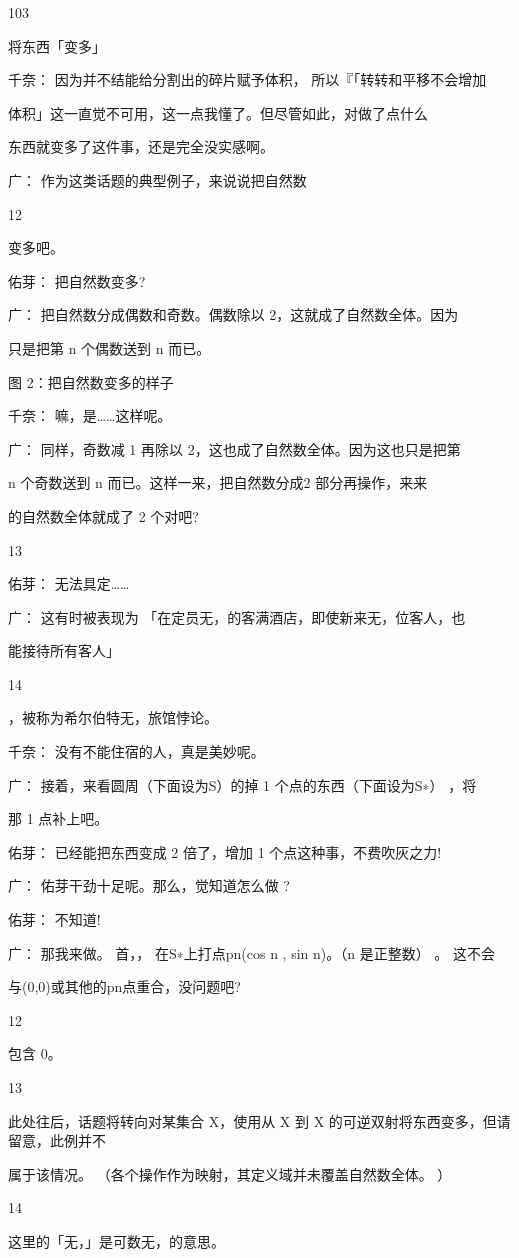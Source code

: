 103\par
将东西「变多」\par
千奈： 因为并不结能给分割出的碎片赋予体积， 所以『「转转和平移不会增加\par
体积」这一直觉不可用，这一点我懂了。但尽管如此，对做了点什么\par
东西就变多了这件事，还是完全没实感啊。\par
广： 作为这类话题的典型例子，来说说把自然数\par
12\par
变多吧。\par
佑芽： 把自然数变多?\par
广： 把自然数分成偶数和奇数。偶数除以 2，这就成了自然数全体。因为\par
只是把第 n 个偶数送到 n 而已。\par
图 2：把自然数变多的样子\par
千奈： 嘛，是……这样呢。\par
广： 同样，奇数减 1 再除以 2，这也成了自然数全体。因为这也只是把第\par
n 个奇数送到 n 而已。这样一来，把自然数分成2 部分再操作，来来\par
的自然数全体就成了 2 个对吧?\par
13\par
佑芽： 无法具定……\par
广： 这有时被表现为 「在定员无，的客满酒店，即使新来无，位客人，也\par
能接待所有客人」\par
14\par
，被称为希尔伯特无，旅馆悖论。\par
千奈： 没有不能住宿的人，真是美妙呢。\par
广： 接着，来看圆周（下面设为S）的掉 1 个点的东西（下面设为S∗） ，将\par
那 1 点补上吧。\par
佑芽： 已经能把东西变成 2 倍了，增加 1 个点这种事，不费吹灰之力!\par
广： 佑芽干劲十足呢。那么，觉知道怎么做 ?\par
佑芽： 不知道!\par
广： 那我来做。 首，， 在S∗上打点pn(cos n , sin n)。（n 是正整数） 。 这不会\par
与(0,0)或其他的pn点重合，没问题吧?\par
12\par
包含 0。\par
13\par
此处往后，话题将转向对某集合 X，使用从 X 到 X 的可逆双射将东西变多，但请留意，此例并不\par
属于该情况。 （各个操作作为映射，其定义域并未覆盖自然数全体。 ）\par
14\par
这里的「无，」是可数无，的意思。\par


